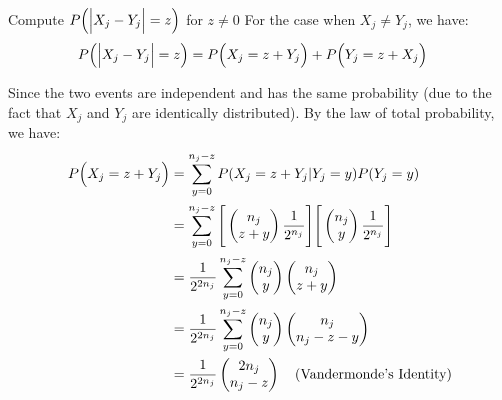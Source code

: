 \begin{solution*}
    \begin{subproof}{Compute $P\Big( \Big| X_j - Y_j \Big| = z \Big)$ for $z\ne 0$}
        For the case when $X_j \ne Y_j$, we have:
        \begin{align*}
            P\Big( \Big| X_j - Y_j \Big| = z \Big) 
                &= P\Big( X_j = z + Y_j \Big) + P\Big( Y_j = z + X_j \Big)
        \end{align*}

        \noindent Since the two events are independent and has the same probability (due to the fact that $X_j$ and $Y_j$ are identically distributed). By the law of total probability, we have:
        \begin{align*}
            P\Big( X_j = z + Y_j \Big)
                &= \sum_{y=0}^{n_j - z} P(X_j = z + Y_j | Y_j = y)P(Y_j = y) \\
                &= \sum_{y=0}^{n_j - z} \Bigg[ \begin{pmatrix} n_j \\ z + y \end{pmatrix} \frac{1}{2^{n_j}} \Bigg] \Bigg[  \begin{pmatrix} n_j \\ y \end{pmatrix} \frac{1}{2^{n_j}}  \Bigg] \\
                &= \frac{1}{2^{2n_j}}\sum_{y=0}^{n_j-z} \begin{pmatrix} n_j \\ y \end{pmatrix} \begin{pmatrix} n_j \\ z + y \end{pmatrix} \\
                &= \frac{1}{2^{2n_j}}\sum_{y=0}^{n_j-z} \begin{pmatrix} n_j \\ y \end{pmatrix} \begin{pmatrix} n_j \\ n_j - z - y \end{pmatrix} \\
                &= \frac{1}{2^{2n_j}}\begin{pmatrix}
                    2n_j \\ n_j - z
                \end{pmatrix} \ \ \ \text{(Vandermonde's Identity)}
        \end{align*}


\end{subproof}
\end{solution*}

